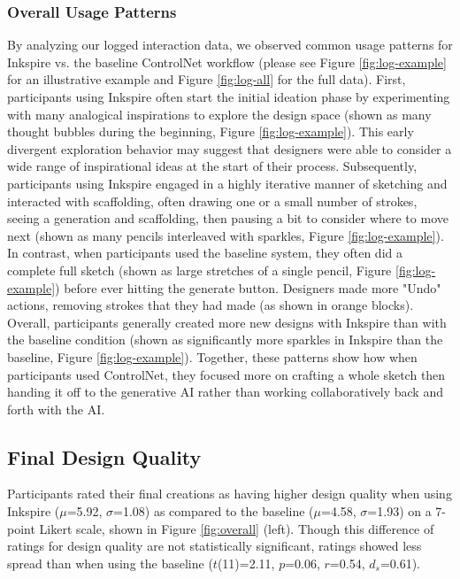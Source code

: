 \documentclass[sigconf, screen]{acmart}
\begin{document}
\subsubsection{Overall Usage Patterns}
By analyzing our logged interaction data, we observed common usage patterns for Inkspire vs. the baseline ControlNet workflow (please see Figure \ref{fig:log-example} for an illustrative example and Figure \ref{fig:log-all} for the full data).
First, participants using Inkspire often start the initial ideation phase by experimenting with many analogical inspirations to explore the design space (shown as many thought bubbles during the beginning, Figure \ref{fig:log-example}). This early divergent exploration behavior may suggest that designers were able to consider a wide range of inspirational ideas at the start of their process. Subsequently, participants using Inkspire engaged in a highly iterative manner of sketching and interacted with scaffolding, often drawing one or a small number of strokes, seeing a generation and scaffolding, then pausing a bit to consider where to move next (shown as many pencils interleaved with sparkles, Figure \ref{fig:log-example}).
In contrast, when participants used the baseline system, they often did a complete full sketch (shown as large stretches of a single pencil, Figure \ref{fig:log-example}) before ever hitting the generate button.
Designers made more "Undo" actions, removing strokes that they had made (as shown in orange blocks). 
Overall, participants generally created more new designs with Inkspire than with the baseline condition (shown as significantly more sparkles in Inkspire than the baseline, Figure \ref{fig:log-example}).
Together, these patterns show how when participants used ControlNet, they focused more on crafting a whole sketch then handing it off to the generative AI rather than working collaboratively back and forth with the AI.

\subsection{Final Design Quality}
Participants rated their final creations as having higher design quality when using Inkspire ($\mu$=5.92, $\sigma$=1.08) as compared to the baseline ($\mu$=4.58, $\sigma$=1.93) on a 7-point Likert scale, shown in Figure \ref{fig:overall} (left). Though this difference of ratings for design quality are not statistically significant, ratings showed less spread than when using the baseline ($t$(11)=2.11, $p$=0.06, $r$=0.54, $d_s$=0.61).
\end{document}
